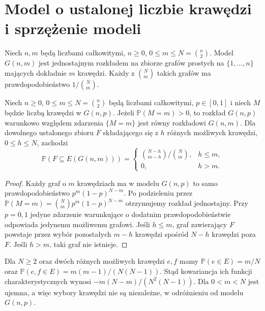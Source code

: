 \section{Model o ustalonej liczbie krawędzi i sprzężenie modeli}
\label{sec:tg-random-gnm}

\begin{definicja}[Model $G(n,m)$]
\label{def:tg-random-gnm}
Niech $n,m$ będą liczbami całkowitymi, $n\geq0$,
$0\leq m\leq N=\binom n2$. Model $G(n,m)$
jest jednostajnym rozkładem na zbiorze grafów prostych
na $\{1,\ldots,n\}$ mających dokładnie $m$ krawędzi.
Każdy z $\binom Nm$ takich grafów ma prawdopodobieństwo
$1/\binom Nm$.
\end{definicja}

\begin{stwierdzenie}
\label{prop:tg-random-conditional-gnm}
Niech $n\geq0$, $0\leq m\leq N=\binom n2$ będą liczbami
całkowitymi, $p\in[0,1]$ i niech $M$ będzie liczbą
krawędzi w $G(n,p)$. Jeżeli $\mathbb P(M=m)>0$, to rozkład $G(n,p)$ warunkowo
względem zdarzenia $\{M=m\}$ jest równy rozkładowi
$G(n,m)$. Dla dowolnego ustalonego zbioru $F$
składającego się z $h$ różnych możliwych krawędzi,
$0\leq h\leq N$, zachodzi
\[
\mathbb P(F\subseteq E(G(n,m)))=
\begin{cases}
\binom{N-h}{m-h}/\binom Nm,&h\leq m,\\
0,&h>m.
\end{cases}
\]
\end{stwierdzenie}
\begin{proof}
Każdy graf o $m$ krawędziach ma w modelu $G(n,p)$
to samo prawdopodobieństwo $p^m(1-p)^{N-m}$.
Po podzieleniu przez $\mathbb P(M=m)=
\binom Nm p^m(1-p)^{N-m}$ otrzymujemy rozkład
jednostajny. Przy $p=0,1$ jedyne zdarzenie
warunkujące o dodatnim prawdopodobieństwie
odpowiada jedynemu możliwemu grafowi.
Jeśli $h\leq m$, graf zawierający $F$ powstaje
przez wybór pozostałych $m-h$ krawędzi spośród
$N-h$ krawędzi poza $F$. Jeśli $h>m$, taki graf
nie istnieje.
\end{proof}

\begin{przyklad}
Dla $N\geq2$ oraz dwóch różnych możliwych krawędzi
$e,f$ mamy
$\mathbb P(e\in E)=m/N$ oraz
$\mathbb P(e,f\in E)=m(m-1)/(N(N-1))$.
Stąd kowariancja ich funkcji charakterystycznych
wynosi $-m(N-m)/(N^2(N-1))$. Dla $0<m<N$ jest
ujemna, a więc wybory krawędzi nie są niezależne,
w odróżnieniu od modelu $G(n,p)$.
\end{przyklad}

